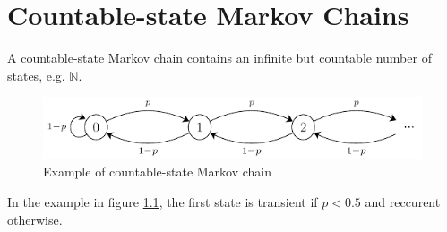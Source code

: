 \documentclass[12pt, openany]{report}
\theoremstyle{definition}
\begin{document}
\chapter{Countable-state Markov Chains}
A countable-state Markov chain contains an infinite but countable number of states, e.g. $\mathbb{N}$. 
\begin{figure}[H]
	\centering
	\includegraphics[width=.8\textwidth]{img/countable_markov.png}
	\caption{Example of countable-state Markov chain}
	\label{fig:countable_markov}
\end{figure}
In the example in figure \ref{fig:countable_markov}, the first state is transient if $p<0.5$ and reccurent otherwise. 
\end{document}

